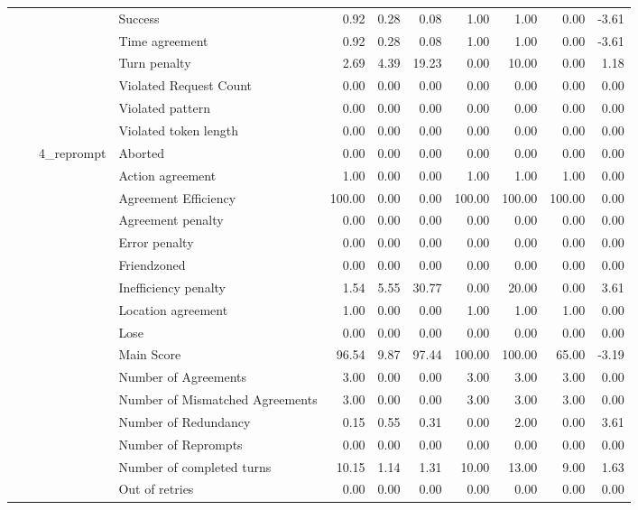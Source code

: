 \begin{tabular}{llllrrrrrrr}
 &  &  & Success & 0.92 & 0.28 & 0.08 & 1.00 & 1.00 & 0.00 & -3.61 \\
 &  &  & Time agreement & 0.92 & 0.28 & 0.08 & 1.00 & 1.00 & 0.00 & -3.61 \\
 &  &  & Turn penalty & 2.69 & 4.39 & 19.23 & 0.00 & 10.00 & 0.00 & 1.18 \\
 &  &  & Violated Request Count & 0.00 & 0.00 & 0.00 & 0.00 & 0.00 & 0.00 & 0.00 \\
 &  &  & Violated pattern & 0.00 & 0.00 & 0.00 & 0.00 & 0.00 & 0.00 & 0.00 \\
 &  &  & Violated token length & 0.00 & 0.00 & 0.00 & 0.00 & 0.00 & 0.00 & 0.00 \\
\cline{3-11}
 &  & \multirow[t]{27}{*}{4_reprompt} & Aborted & 0.00 & 0.00 & 0.00 & 0.00 & 0.00 & 0.00 & 0.00 \\
 &  &  & Action agreement & 1.00 & 0.00 & 0.00 & 1.00 & 1.00 & 1.00 & 0.00 \\
 &  &  & Agreement Efficiency & 100.00 & 0.00 & 0.00 & 100.00 & 100.00 & 100.00 & 0.00 \\
 &  &  & Agreement penalty & 0.00 & 0.00 & 0.00 & 0.00 & 0.00 & 0.00 & 0.00 \\
 &  &  & Error penalty & 0.00 & 0.00 & 0.00 & 0.00 & 0.00 & 0.00 & 0.00 \\
 &  &  & Friendzoned & 0.00 & 0.00 & 0.00 & 0.00 & 0.00 & 0.00 & 0.00 \\
 &  &  & Inefficiency penalty & 1.54 & 5.55 & 30.77 & 0.00 & 20.00 & 0.00 & 3.61 \\
 &  &  & Location agreement & 1.00 & 0.00 & 0.00 & 1.00 & 1.00 & 1.00 & 0.00 \\
 &  &  & Lose & 0.00 & 0.00 & 0.00 & 0.00 & 0.00 & 0.00 & 0.00 \\
 &  &  & Main Score & 96.54 & 9.87 & 97.44 & 100.00 & 100.00 & 65.00 & -3.19 \\
 &  &  & Number of Agreements & 3.00 & 0.00 & 0.00 & 3.00 & 3.00 & 3.00 & 0.00 \\
 &  &  & Number of Mismatched Agreements & 3.00 & 0.00 & 0.00 & 3.00 & 3.00 & 3.00 & 0.00 \\
 &  &  & Number of Redundancy & 0.15 & 0.55 & 0.31 & 0.00 & 2.00 & 0.00 & 3.61 \\
 &  &  & Number of Reprompts & 0.00 & 0.00 & 0.00 & 0.00 & 0.00 & 0.00 & 0.00 \\
 &  &  & Number of completed turns & 10.15 & 1.14 & 1.31 & 10.00 & 13.00 & 9.00 & 1.63 \\
 &  &  & Out of retries & 0.00 & 0.00 & 0.00 & 0.00 & 0.00 & 0.00 & 0.00 \\

\end{tabular}
